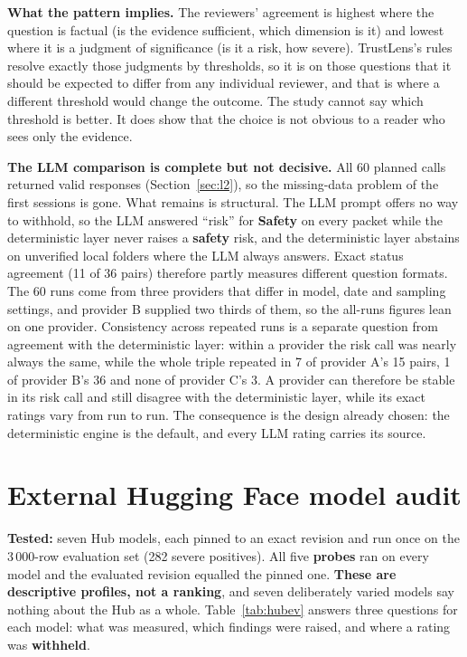 \textbf{What the pattern implies.} The reviewers' agreement is highest where the question is factual (is the evidence sufficient, which dimension is it) and lowest where it is a judgment of significance (is it a risk, how severe). TrustLens's rules resolve exactly those judgments by thresholds, so it is on those questions that it should be expected to differ from any individual reviewer, and that is where a different threshold would change the outcome. The study cannot say which threshold is better. It does show that the choice is not obvious to a reader who sees only the evidence.

\textbf{The LLM comparison is complete but not decisive.} All 60 planned calls returned valid responses (Section~\ref{sec:l2}), so the missing-data problem of the first sessions is gone. What remains is structural. The LLM prompt offers no way to withhold, so the LLM answered ``risk'' for \textbf{Safety} on every packet while the deterministic layer never raises a \textbf{safety} risk, and the deterministic layer abstains on unverified local folders where the LLM always answers. Exact status agreement (11 of 36 pairs) therefore partly measures different question formats. The 60 runs come from three providers that differ in model, date and sampling settings, and provider B supplied two thirds of them, so the all-runs figures lean on one provider. Consistency across repeated runs is a separate question from agreement with the deterministic layer: within a provider the risk call was nearly always the same, while the whole triple repeated in 7 of provider A's 15 pairs, 1 of provider B's 36 and none of provider C's 3. A provider can therefore be stable in its risk call and still disagree with the deterministic layer, while its exact ratings vary from run to run. The consequence is the design already chosen: the deterministic engine is the default, and every LLM rating carries its source.

\section{External Hugging Face model audit}\label{sec:hub}
\textbf{Tested:} seven Hub models, each pinned to an exact revision and run once on the 3\,000-row evaluation set (282 severe positives). All five \textbf{probes} ran on every model and the evaluated revision equalled the pinned one. \textbf{These are descriptive profiles, not a ranking}, and seven deliberately varied models say nothing about the Hub as a whole. Table~\ref{tab:hubev} answers three questions for each model: what was measured, which findings were raised, and where a rating was \textbf{withheld}.

